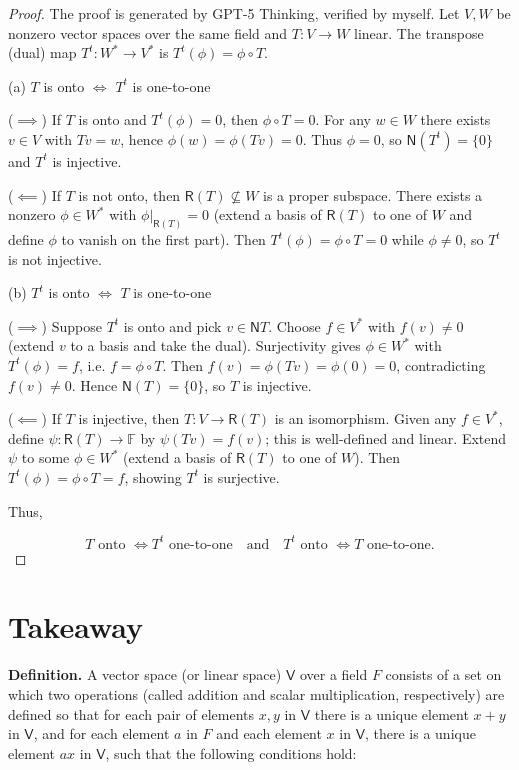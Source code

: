 \documentclass{article}
\newcommand{\0}{\mathit{0}}
\begin{document}
\begin{proof}
    The proof is generated by GPT-5 Thinking, verified by myself.
    Let $V,W$ be nonzero vector spaces over the same field and $T:V\to W$ linear.
    The transpose (dual) map $T^{t}:W^{*}\to V^{*}$ is $T^{t}(\phi)=\phi\circ T$.

    (a) $T$ is onto  $\iff$  $T^{t}$ is one-to-one

    ($\implies$) If $T$ is onto and $T^{t}(\phi)=0$, then $\phi\circ T=0$.
    For any $w\in W$ there exists $v\in V$ with $T v=w$, hence
    $\phi(w)=\phi(Tv)=0$. Thus $\phi=0$, so $\mathsf{N}(T^{t})=\{\0\}$ and $T^{t}$ is injective.

    ($\impliedby$) If $T$ is not onto, then $\mathsf{R}(T)\not\subseteq W$ is a proper subspace.
    There exists a nonzero $\phi\in W^{*}$ with $\phi|_{\mathsf{R}(T)}=0$ (extend a basis of $\mathsf{R}(T)$ to one of $W$ and define $\phi$ to vanish on the first part). Then
    $T^{t}(\phi)=\phi\circ T=0$ while $\phi\neq 0$, so $T^{t}$ is not injective.

    (b) $T^{t}$ is onto  $\iff$  $T$ is one-to-one

    ($\implies$) Suppose $T^{t}$ is onto and pick $v\in\mathsf{N}T$.
    Choose $f\in V^{*}$ with $f(v)\neq 0$ (extend $v$ to a basis and take the dual).
    Surjectivity gives $\phi\in W^{*}$ with $T^{t}(\phi)=f$, i.e. $f=\phi\circ T$.
    Then $f(v)=\phi(Tv)=\phi(0)=0$, contradicting $f(v)\neq 0$. Hence $\mathsf{N}(T)=\{0\}$, so $T$ is injective.

    ($\impliedby$) If $T$ is injective, then $T:V\to \mathsf{R}(T)$ is an isomorphism.
    Given any $f\in V^{*}$, define $\psi:\mathsf{R}(T)\to \mathbb{F}$ by $\psi(Tv)=f(v)$; this is well-defined and linear.
    Extend $\psi$ to some $\phi\in W^{*}$ (extend a basis of $\mathsf{R}(T)$ to one of $W$).
    Then $T^{t}(\phi)=\phi\circ T=f$, showing $T^{t}$ is surjective.

    Thus,

    \[
        T\text{ onto } \iff T^{t}\text{ one-to-one}\quad\text{and}\quad T^{t}\text{ onto } \iff T\text{ one-to-one.}
    \]

\end{proof}


\newpage

\section{Takeaway}

\textbf{Definition.}
A vector space (or linear space) $\mathsf{V}$ over a field $F$ consists of
a set on which two operations (called addition and scalar multiplication,
respectively) are defined so that for each pair of elements $x, y$ in
$\mathsf{V}$ there is a unique element $x + y$ in $\mathsf{V}$, and for
each element $a$ in $F$ and each element $x$ in $\mathsf{V}$, there is a
unique element $ax$ in $\mathsf{V}$, such that the following conditions hold:
\end{document}
